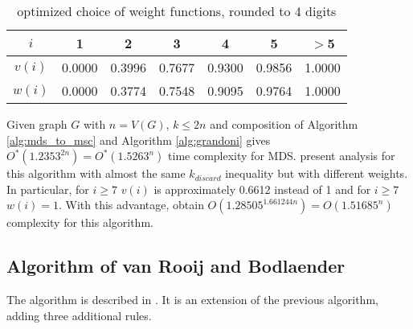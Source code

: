 \begin{table}[ht]
    \centering
    \begin{tabular}{c|c|c|c|c|c|c}
        $i$ & 1 & 2 & 3 & 4 & 5 & $>$5 \\
        \hline
        $v(i)$ & 0.0000 & 0.3996 & 0.7677 & 0.9300 & 0.9856 & 1.0000 \\
        \hline
        $w(i)$ & 0.0000 & 0.3774 & 0.7548 & 0.9095 & 0.9764 & 1.0000 \\
        \hline
    \end{tabular}
    \caption{optimized choice of weight functions, rounded to 4 digits}
\end{table}

Given graph $G$ with $n = V(G)$, $k\leq 2n$ and composition of Algorithm \ref{alg:mds_to_msc} and Algorithm \ref{alg:grandoni} gives $O^*(1.2353^{2n}) = O^*(1.5263^n)$ time complexity for MDS. \citeauthor{VANROOIJ20112147} \cite{VANROOIJ20112147} present analysis for this algorithm with almost the same $k_{discard}$ inequality but with different weights. In particular, for $i\geq 7$ $v(i)$ is approximately 0.6612 instead of 1 and for $i\geq 7$ $w(i) = 1$. With this advantage, \citeauthor{VANROOIJ20112147} obtain $O(1.28505^{1.661244n}) = O(1.51685^n)$ complexity for this algorithm.
\subsection{Algorithm of van Rooij and Bodlaender}
The algorithm is described in \cite{VANROOIJ20112147}. It is an extension of the previous algorithm, adding three additional rules.

